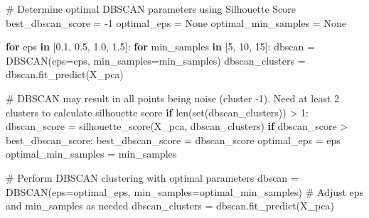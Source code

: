 \documentclass[
  12pt,
  letterpaper,
  DIV=11,
  numbers=noendperiod]{scrartcl}
\newenvironment{Shaded}{\begin{snugshade}}{\end{snugshade}}
\newcommand{\BuiltInTok}[1]{\textcolor[rgb]{0.00,0.23,0.31}{#1}}
\newcommand{\CommentTok}[1]{\textcolor[rgb]{0.37,0.37,0.37}{#1}}
\newcommand{\ControlFlowTok}[1]{\textcolor[rgb]{0.00,0.23,0.31}{\textbf{#1}}}
\newcommand{\DecValTok}[1]{\textcolor[rgb]{0.68,0.00,0.00}{#1}}
\newcommand{\FloatTok}[1]{\textcolor[rgb]{0.68,0.00,0.00}{#1}}
\newcommand{\KeywordTok}[1]{\textcolor[rgb]{0.00,0.23,0.31}{\textbf{#1}}}
\newcommand{\NormalTok}[1]{\textcolor[rgb]{0.00,0.23,0.31}{#1}}
\newcommand{\OperatorTok}[1]{\textcolor[rgb]{0.37,0.37,0.37}{#1}}
\newcommand{\VariableTok}[1]{\textcolor[rgb]{0.07,0.07,0.07}{#1}}
\begin{document}
\begin{Shaded}
\begin{Highlighting}[]
\CommentTok{\# Determine optimal DBSCAN parameters using Silhouette Score}
\NormalTok{best\_dbscan\_score }\OperatorTok{=} \OperatorTok{{-}}\DecValTok{1}
\NormalTok{optimal\_eps }\OperatorTok{=} \VariableTok{None}
\NormalTok{optimal\_min\_samples }\OperatorTok{=} \VariableTok{None}

\ControlFlowTok{for}\NormalTok{ eps }\KeywordTok{in}\NormalTok{ [}\FloatTok{0.1}\NormalTok{, }\FloatTok{0.5}\NormalTok{, }\FloatTok{1.0}\NormalTok{, }\FloatTok{1.5}\NormalTok{]:}
    \ControlFlowTok{for}\NormalTok{ min\_samples }\KeywordTok{in}\NormalTok{ [}\DecValTok{5}\NormalTok{, }\DecValTok{10}\NormalTok{, }\DecValTok{15}\NormalTok{]:}
\NormalTok{        dbscan }\OperatorTok{=}\NormalTok{ DBSCAN(eps}\OperatorTok{=}\NormalTok{eps, min\_samples}\OperatorTok{=}\NormalTok{min\_samples)}
\NormalTok{        dbscan\_clusters }\OperatorTok{=}\NormalTok{ dbscan.fit\_predict(X\_pca)}
        
        \CommentTok{\# DBSCAN may result in all points being noise (cluster {-}1).  Need at least 2 clusters to calculate silhouette score}
        \ControlFlowTok{if} \BuiltInTok{len}\NormalTok{(}\BuiltInTok{set}\NormalTok{(dbscan\_clusters)) }\OperatorTok{\textgreater{}} \DecValTok{1}\NormalTok{:}
\NormalTok{            dbscan\_score }\OperatorTok{=}\NormalTok{ silhouette\_score(X\_pca, dbscan\_clusters)}
            \ControlFlowTok{if}\NormalTok{ dbscan\_score }\OperatorTok{\textgreater{}}\NormalTok{ best\_dbscan\_score:}
\NormalTok{                best\_dbscan\_score }\OperatorTok{=}\NormalTok{ dbscan\_score}
\NormalTok{                optimal\_eps }\OperatorTok{=}\NormalTok{ eps}
\NormalTok{                optimal\_min\_samples }\OperatorTok{=}\NormalTok{ min\_samples}

\CommentTok{\# Perform DBSCAN clustering with optimal parameters}
\NormalTok{dbscan }\OperatorTok{=}\NormalTok{ DBSCAN(eps}\OperatorTok{=}\NormalTok{optimal\_eps, min\_samples}\OperatorTok{=}\NormalTok{optimal\_min\_samples)  }\CommentTok{\# Adjust eps and min\_samples as needed}
\NormalTok{dbscan\_clusters }\OperatorTok{=}\NormalTok{ dbscan.fit\_predict(X\_pca)}


\end{Highlighting}
\end{Shaded}
\end{document}
